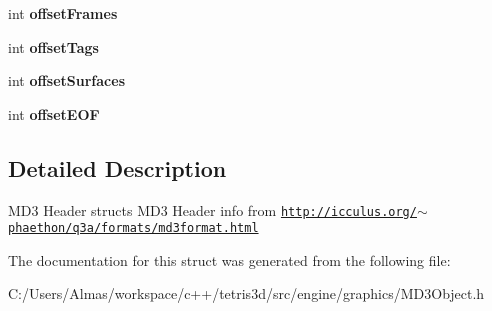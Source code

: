 \begin{DoxyCompactItemize}
\item 
\hypertarget{struct_m_d3_header_a07476eca86e95131a689db9c5bc38bf6}{int {\bfseries offset\-Frames}}\label{struct_m_d3_header_a07476eca86e95131a689db9c5bc38bf6}

\item 
\hypertarget{struct_m_d3_header_af7a30163a580a91016650968c96eee21}{int {\bfseries offset\-Tags}}\label{struct_m_d3_header_af7a30163a580a91016650968c96eee21}

\item 
\hypertarget{struct_m_d3_header_a06adf5e0a826e5d01305beaaade7aa5c}{int {\bfseries offset\-Surfaces}}\label{struct_m_d3_header_a06adf5e0a826e5d01305beaaade7aa5c}

\item 
\hypertarget{struct_m_d3_header_a8a017b12bb8e5a027abc719f8009448b}{int {\bfseries offset\-E\-O\-F}}\label{struct_m_d3_header_a8a017b12bb8e5a027abc719f8009448b}

\end{DoxyCompactItemize}


\subsection{Detailed Description}
M\-D3 Header structs M\-D3 Header info from \href{http://icculus.org/~phaethon/q3a/formats/md3format.html}{\tt http\-://icculus.\-org/$\sim$phaethon/q3a/formats/md3format.\-html} 

The documentation for this struct was generated from the following file\-:\begin{DoxyCompactItemize}
\item 
C\-:/\-Users/\-Almas/workspace/c++/tetris3d/src/engine/graphics/M\-D3\-Object.\-h\end{DoxyCompactItemize}
